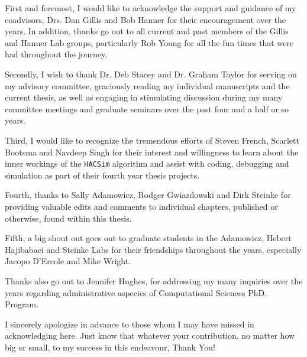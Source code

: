 \begin{acknowledgements}\label{acknow}
\ssp

\noindent First and foremost, I would like to acknowledge the support and guidance of my \\ coadvisors, Drs. Dan Gillis and Bob Hanner for their encouragement over the years. In addition, thanks go out to all current and past members of the Gillis and Hanner Lab groups, particularly Rob Young for all the fun times that were had throughout the journey.

\vspace{5mm}

\noindent Secondly, I wish to thank Dr. Deb Stacey and Dr. Graham Taylor for serving on my advisory committee, graciously reading my individual manuscripts and the current thesis, as well as engaging in stimulating discussion during my many committee meetings and graduate seminars over the past four and a half or so years.

\vspace{5mm}

\noindent Third, I would like to recognize the tremendous efforts of Steven French, Scarlett Bootsma and Navdeep Singh for their interest and willingness to learn about the inner workings of the {\tt HACSim} algorithm and assist with coding, debugging and simulation as part of their fourth year thesis projects.

\vspace{5mm}

\noindent Fourth, thanks to Sally Adamowicz, Rodger Gwiazdowski and Dirk Steinke for providing valuable edits and comments to individual chapters, published or otherwise, found within this thesis.

\vspace{5mm}

\noindent Fifth, a big shout out goes out to graduate students in the Adamowicz, Hebert \\ Hajibabaei and Steinke Labs for their friendships throughout the years, especially Jacopo D'Ercole and Mike Wright.

\vspace{5mm}

\noindent Thanks also go out to Jennifer Hughes, for addressing my many inquiries over the years regarding administrative aspecies of Computational Sciences PhD. Program.

\vspace{5mm}

\noindent I sincerely apologize in advance to those whom I may have missed in acknowledging here. Just know that whatever your contribution, no matter how big or small, to my success in this endeavour, Thank You!


\end{acknowledgements}
